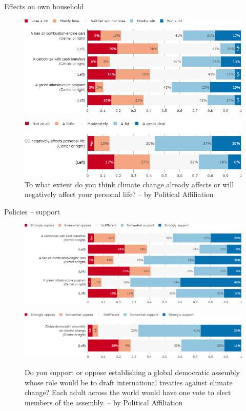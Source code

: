 \documentclass[aspectratio=169,9pt,dvipsnames]{beamer}
\begin{document}
\begin{frame}{Effects on own household}%
\begin{figure}[h!]
\caption{Do you think that financially your household would win or lose from the following policy? -- by Political Affiliation}
\includegraphics[width=.6\textwidth]{../figures/US/policies_win_lose_self_US_pol.png} \\
\vspace{.1cm}
\caption{To what extent do you think climate change already affects or will negatively affect your personal life? -- by Political Affiliation}
\includegraphics[width=.5\textwidth]{../figures/US/CC_affects_self_US_pol.png}
\end{figure}
\end{frame}

\begin{frame}{Policies – support}%
\vspace{-.5cm}
\begin{figure}[h!]
\caption{Do you support or oppose the following policy? -- by Political Affiliation}
\includegraphics[width=.6\textwidth]{../figures/US/policies_support_US_pol.png} \\
\vspace{.5cm}
\caption{Do you support or oppose establishing a global democratic assembly whose role would be to draft international treaties against climate change? Each adult across the world would have one vote to elect members of the assembly. -- by Political Affiliation}
\includegraphics[width=.6\textwidth]{../figures/US/global_assembly_support_US_pol.png} \\
\end{figure}
\end{frame}
\end{document}
